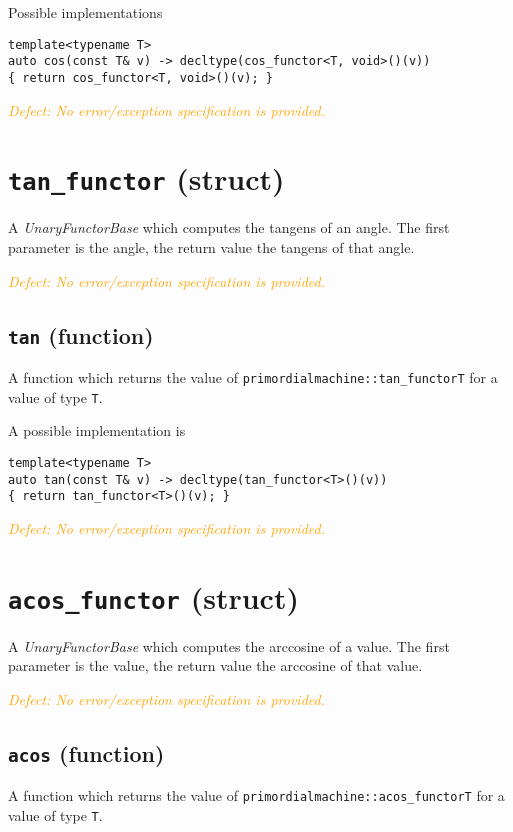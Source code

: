 \documentclass[oneside]{book}
\begin{document}
\noindent{}Possible implementations
\begin{verbatim}
template<typename T>
auto cos(const T& v) -> decltype(cos_functor<T, void>()(v))
{ return cos_functor<T, void>()(v); }
\end{verbatim}

\noindent{}\textcolor{orange}{\textit{Defect: No error/exception specification is provided.}}

\section{\texttt{tan\_functor} (struct)}
A \textit{UnaryFunctorBase} which computes the
tangens
of an angle.
The first parameter is the angle, the return value the tangens of that angle.

\noindent{}\textcolor{orange}{\textit{Defect: No error/exception specification is provided.}}

\subsection{\texttt{tan} (function)}
A function which returns the value of \texttt{primordialmachine::tan\_functor\textlangle T\textrangle}
for a value of type \texttt{T}.

\noindent{}A possible implementation is
\begin{verbatim}
template<typename T>
auto tan(const T& v) -> decltype(tan_functor<T>()(v))
{ return tan_functor<T>()(v); }
\end{verbatim}

\noindent{}\textcolor{orange}{\textit{Defect: No error/exception specification is provided.}}

\section{\texttt{acos\_functor} (struct)}
A \textit{UnaryFunctorBase} which computes the
arccosine
of a value.
The first parameter is the value, the return value the arccosine of that value.

\noindent{}\textcolor{orange}{\textit{Defect: No error/exception specification is provided.}}

\subsection{\texttt{acos} (function)}
A function which returns the value of \texttt{primordialmachine::acos\_functor\textlangle T\textrangle}
for a value of type \texttt{T}.
\end{document}
